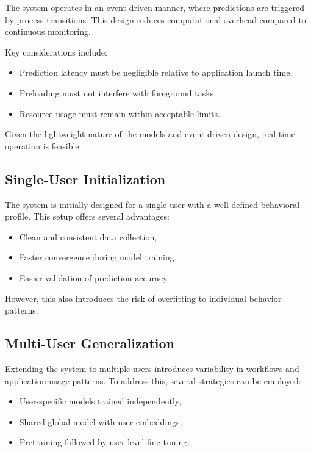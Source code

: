 \documentclass[11pt]{article}
\begin{document}
The system operates in an event-driven manner, where predictions are triggered by process transitions. This design reduces computational overhead compared to continuous monitoring.

Key considerations include:

\begin{itemize}
\item Prediction latency must be negligible relative to application launch time,
\item Preloading must not interfere with foreground tasks,
\item Resource usage must remain within acceptable limits.
\end{itemize}

Given the lightweight nature of the models and event-driven design, real-time operation is feasible.

\subsection{Single-User Initialization}

The system is initially designed for a single user with a well-defined behavioral profile. This setup offers several advantages:

\begin{itemize}
\item Clean and consistent data collection,
\item Faster convergence during model training,
\item Easier validation of prediction accuracy.
\end{itemize}

However, this also introduces the risk of overfitting to individual behavior patterns.

\subsection{Multi-User Generalization}

Extending the system to multiple users introduces variability in workflows and application usage patterns. To address this, several strategies can be employed:

\begin{itemize}
\item User-specific models trained independently,
\item Shared global model with user embeddings,
\item Pretraining followed by user-level fine-tuning.
\end{itemize}
\end{document}
